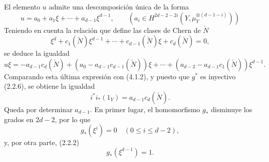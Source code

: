 El elemento $u$ admite una descomposición única de la forma
\[
u=a_0+a_1\xi+\cdots+a_{d-1}\xi^{d-1},
\qquad
(a_i\in H^{2d-2-2i}(Y,\mu_Y^{\otimes(d-1-i)}))
\tag{4.1.3}
\]
Teniendo en cuenta la relación que define las clases de Chern de $\check N$
\[
\xi^d+c_1(\check N)\xi^{d-1}+\cdots+c_{d-1}(\check N)\xi+c_d(\check N)=0,
\tag{4.1.4}
\]
se deduce la igualdad
\[
u\xi=-a_{d-1}c_d(\check N)+(a_0-a_{d-1}c_{d-1}(\check N))\xi
+\cdots+(a_{d-2}-a_{d-1}c_1(\check N))\xi^{d-1}.
\]
Comparando esta última expresión con (4.1.2), y puesto que $g^*$ es inyectivo (2.2.6), se obtiene la igualdad
\[
i^*i_*(1_Y)=a_{d-1}c_d(\check N).
\tag{4.1.5}
\]
Queda por determinar $a_{d-1}$. En primer lugar, el homomorfismo $g_*$ disminuye los grados en $2d-2$, por lo que
\[
g_*(\xi^i)=0\quad(0\le i\le d-2),
\]
y, por otra parte, (2.2.2)
\[
g_*(\xi^{d-1})=1.
\]
